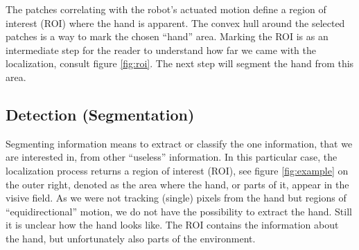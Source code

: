 %
The patches correlating with the robot's actuated motion define a region of interest (ROI) where the hand is apparent. The convex hull around the selected patches is a way to mark the chosen ``hand'' area. Marking the ROI is as an intermediate step for the reader to understand how far we came with the localization, consult figure \ref{fig:roi}. The next step will segment the hand from this area.
%
%
%
%
\subsection{Detection (Segmentation)}\label{method:detection}
Segmenting information means to extract or classify the one information, that we are interested in, from other ``useless'' information. In this particular case, the localization process returns a region of interest (ROI), see figure \ref{fig:example} on the outer right, denoted as the area where the hand, or parts of it, appear in the visive field. As we were not tracking (single) pixels from the hand but regions of ``equidirectional'' motion, we do not have the possibility to extract the hand. Still it is unclear how the hand looks like. The ROI contains the information about the hand, but unfortunately also parts of the environment.

